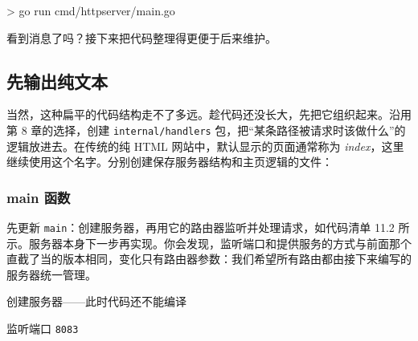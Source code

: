 \begin{shellcode}[]
> go run cmd/httpserver/main.go
\end{shellcode}

看到消息了吗？接下来把代码整理得更便于后来维护。

\subsection{先输出纯文本}

当然，这种扁平的代码结构走不了多远。趁代码还没长大，先把它组织起来。沿用第 8 章的选择，创建 \texttt{internal/handlers} 包，把“某条路径被请求时该做什么”的逻辑放进去。在传统的纯 HTML 网站中，默认显示的页面通常称为 \emph{index}，这里继续使用这个名字。分别创建保存服务器结构和主页逻辑的文件：

\begin{treebox}
\end{treebox}

\subsubsection{main 函数}

先更新 \texttt{main}：创建服务器，再用它的路由器监听并处理请求，如代码清单 11.2 所示。服务器本身下一步再实现。你会发现，监听端口和提供服务的方式与前面那个直截了当的版本相同，变化只有路由器参数：我们希望所有路由都由接下来编写的服务器统一管理。


\begin{codeannotations}
\item 创建服务器——此时代码还不能编译
\item 监听端口 \texttt{8083}
\end{codeannotations}

